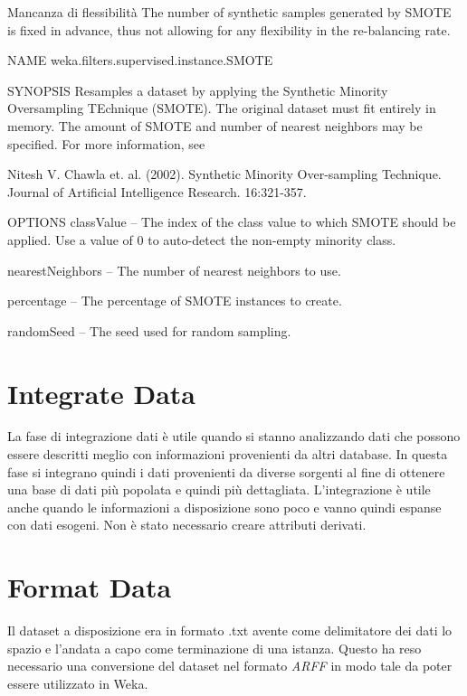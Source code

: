 Mancanza di flessibilità
The number of synthetic samples generated by SMOTE is fixed in advance, thus not allowing for any flexibility in the re-balancing rate.

NAME
weka.filters.supervised.instance.SMOTE

SYNOPSIS
Resamples a dataset by applying the Synthetic Minority Oversampling TEchnique (SMOTE). The original dataset must fit entirely in memory. The amount of SMOTE and number of nearest neighbors may be specified. For more information, see 

Nitesh V. Chawla et. al. (2002). Synthetic Minority Over-sampling Technique. Journal of Artificial Intelligence Research. 16:321-357.

OPTIONS
classValue -- The index of the class value to which SMOTE should be applied. Use a value of 0 to auto-detect the non-empty minority class.

nearestNeighbors -- The number of nearest neighbors to use.

percentage -- The percentage of SMOTE instances to create.

randomSeed -- The seed used for random sampling.

\section{Integrate Data}
La fase di integrazione dati è utile quando si stanno analizzando dati che possono essere descritti meglio con informazioni provenienti da altri database. In questa fase si integrano quindi i dati provenienti da diverse sorgenti al fine di ottenere una base di dati più popolata e quindi più dettagliata. L'integrazione è utile anche quando le informazioni a disposizione sono poco e vanno quindi espanse con dati esogeni.
Non è stato necessario creare attributi derivati.

\section{Format Data}
Il dataset a disposizione era in formato .txt avente come delimitatore dei dati lo spazio e l'andata a capo come terminazione di una istanza. Questo ha reso necessario una conversione del dataset nel formato \textit{ARFF} in modo tale da poter essere utilizzato in Weka.
